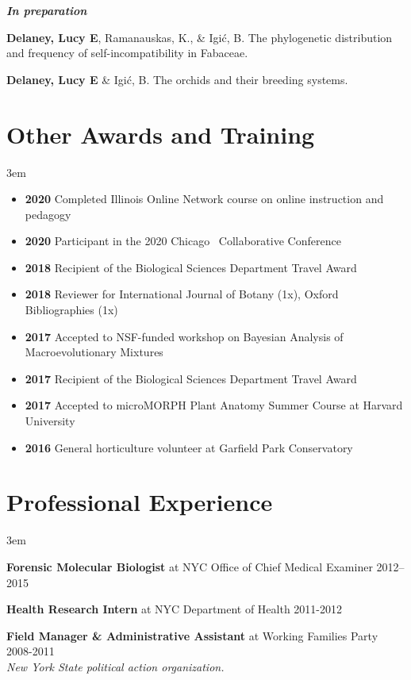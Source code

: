 \documentclass[]{article}
\newlength{\cslhangindent}
\newenvironment{cslreferences}
{\setlength{\parindent}{0pt}
\everypar{\setlength{\hangindent}{\cslhangindent}}\ignorespaces}
{\par}
\begin{document}
\textbf{\textit{In preparation}}
\vspace{2mm}

\begin{cslreferences}
\textbf{Delaney, Lucy E}, Ramanauskas, K., \& Igić, B. The phylogenetic distribution and frequency of self-incompatibility in Fabaceae.

\textbf{Delaney, Lucy E} \& Igić, B. The orchids and their breeding systems.\\
\end{cslreferences}
\vspace{2mm}

\section{Other Awards and Training}

\vspace{2mm}
\leftskip 3em

\begin{itemize}[label=$\mathwitch*$]
\item{\textbf{2020} Completed Illinois Online Network course on online instruction and pedagogy}
\item{\textbf{2020} Participant in the 2020 Chicago \textcolor{light-gray}{\faRProject}\ Collaborative Conference \href{https://chircollab.github.io/}{\faLink}}
\item{\textbf{2018} Recipient of the Biological Sciences Department Travel Award}
\item{\textbf{2018} Reviewer for International Journal of Botany (1x), Oxford Bibliographies (1x)}
\item{\textbf{2017} Accepted to NSF-funded workshop on Bayesian Analysis of Macroevolutionary Mixtures \href{http://bamm-project.org/index.html}{\faLink}}
\item{\textbf{2017} Recipient of the Biological Sciences Department Travel Award}
\item{\textbf{2017} Accepted to microMORPH Plant Anatomy Summer Course at Harvard University \href{https://web.archive.org/web/20170922060558/http://arboretum.harvard.edu/tracing-evolution-form-function/"}{\faLink}}
\item{\textbf{2016} General horticulture volunteer at Garfield Park Conservatory \href{https://garfieldconservatory.org/}{\faLink}}
\end{itemize}

\vspace{2mm}
\section{Professional Experience}

\vspace{2mm}
\leftskip 3em

\textbf{Forensic Molecular Biologist} at NYC Office of Chief Medical Examiner \hfill 2012--2015
   
\textbf{Health Research Intern} at NYC Department of Health \hfill 2011-2012
     
\textbf{Field Manager \& Administrative Assistant} at Working Families Party \hfill 2008-2011\\
\textit{New York State political action organization.}
\end{document}
